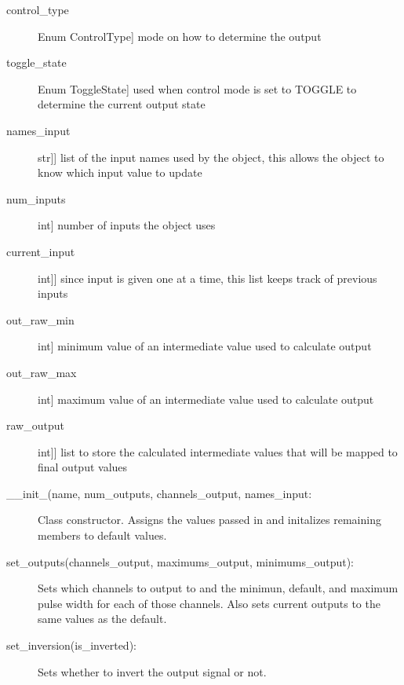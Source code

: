 \documentclass[letterpaper,10pt,english]{sphinxmanual}
\begin{document}
\begin{fulllineitems}
\begin{description}
\item[{control\_type}] \leavevmode{[}Enum ControlType{]}
\sphinxAtStartPar
mode on how to determine the output

\item[{toggle\_state}] \leavevmode{[}Enum ToggleState{]}
\sphinxAtStartPar
used when control mode is set to TOGGLE to determine the current output state

\item[{names\_input}] \leavevmode{[}{[}str{]}{]}
\sphinxAtStartPar
list of the input names used by the object, this allows the object to know which input value to update

\item[{num\_inputs}] \leavevmode{[}int{]}
\sphinxAtStartPar
number of inputs the object uses

\item[{current\_input}] \leavevmode{[}{[}int{]}{]}
\sphinxAtStartPar
since input is given one at a time, this list keeps track of previous inputs

\item[{out\_raw\_min}] \leavevmode{[}int{]}
\sphinxAtStartPar
minimum value of an intermediate value used to calculate output

\item[{out\_raw\_max}] \leavevmode{[}int{]}
\sphinxAtStartPar
maximum value of an intermediate value used to calculate output

\item[{raw\_output}] \leavevmode{[}{[}int{]}{]}
\sphinxAtStartPar
list to store the calculated intermediate values that will be mapped to final output values

\end{description}
\begin{description}
\item[{\_\_init\_(name, num\_outputs, channels\_output, names\_input:}] \leavevmode
\sphinxAtStartPar
Class constructor. Assigns the values passed in and initalizes remaining members to default values.

\item[{set\_outputs(channels\_output, maximums\_output, minimums\_output):}] \leavevmode
\sphinxAtStartPar
Sets which channels to output to and the minimun, default, and maximum pulse width for each of those channels.
Also sets current outputs to the same values as the default.

\item[{set\_inversion(is\_inverted):}] \leavevmode
\sphinxAtStartPar
Sets whether to invert the output signal or not.


\end{description}
\end{fulllineitems}
\end{document}
